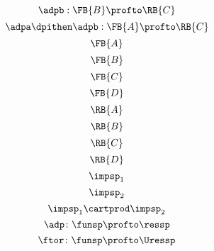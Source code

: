 {\begin{forslides}
\begin{equation}
        \end{equation}
        \begin{equation}
            \label{eq:adp2}
            \adpb: \FB{B} \profto  \RB{C}
        \end{equation}
        \begin{equation}
            \label{eq:adp1adp2}
            \adpa\dpithen\adpb: \FB{A} \profto  \RB{C}
        \end{equation}
        \begin{equation}
            \label{eq:FA}
            \FB{A}
        \end{equation}
        \begin{equation}
            \label{eq:FB}
            \FB{B}
        \end{equation}
        \begin{equation}
            \label{eq:FC}
            \FB{C}
        \end{equation}
        \begin{equation}
            \label{eq:FD}
            \FB{D}
        \end{equation}
        \begin{equation}
            \label{eq:RA}
            \RB{A}
        \end{equation}
        \begin{equation}
            \label{eq:RB}
            \RB{B}
        \end{equation}
        \begin{equation}
            \label{eq:RC}
            \RB{C}
        \end{equation}
        \begin{equation}
            \label{eq:RD}
            \RB{D}
        \end{equation}
        \begin{equation}
            \label{eq:impsp1}
            \impsp_1
        \end{equation}
        \begin{equation}
            \label{eq:impsp2}
            \impsp_2
        \end{equation}
        \begin{equation}
            \label{eq:impsp12}
            \impsp_{1} \cartprod \impsp_{2}
        \end{equation}
        \begin{equation}
            \label{eq:dproba}
            \adp \colon \funsp \profto \ressp
        \end{equation}
        \begin{equation}
            \label{eq:dprob2}
            \ftor \colon \funsp \profto \Uressp
        \end{equation}
    \end{forslides}
}

